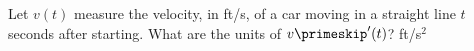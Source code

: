 {Let $v(t)$ measure the velocity, in ft/s, of a car moving in a straight line $t$ seconds after starting. What are the units of $v\primeskip'(t)$?
}
{ft/s$^2$
}
